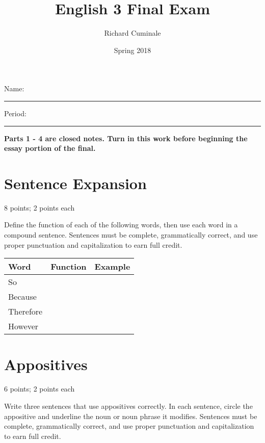 \documentclass[11pt]{article}
\author{Richard Cuminale}
\date{Spring 2018}
\title{English 3 Final Exam}
\begin{document}
\maketitle

Name: \rule{6.0cm}{0.4pt}

\vspace{0.5cm}
Period: \rule{3.0cm}{0.4pt}

\vspace{0.5cm}
\textbf{Parts 1 - 4 are closed notes. Turn in this work before
  beginning the essay portion of the final.} 

\section{Sentence Expansion}
\label{sec:orga557197}
8 points; 2 points each
\vspace{1em}

Define the function of each of the following words, then use each word
in a compound sentence. Sentences must be complete, grammatically
correct, and use proper punctuation and capitalization to earn full
credit. 
\vspace{1em}

\begin{tabular}{lll}
Word & Function & Example\\
\hline
So \vspace{2.0cm} & \hspace{6.0cm}  & \hspace{6.0cm} \\
Because \vspace{2.0cm}&  & \\
Therefore \vspace{2.0cm} &  & \\
However \vspace{2.0cm} &  & \\
\end{tabular}

\newpage
\section{Appositives}
\label{sec:orgfea975e}
6 points; 2 points each
\vspace{1em}

Write three sentences that use appositives correctly.
In each sentence, circle the appositive and underline the noun or
noun phrase it modifies.
Sentences must be complete, grammatically correct, and use proper
punctuation and capitalization to earn full credit.
\end{document}
